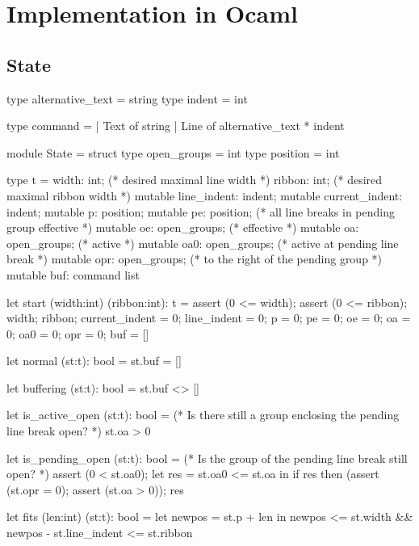 \documentclass[12pt]{article}
\begin{document}
\section{Implementation in Ocaml}


\subsection{State}

\begin{ocaml}
type alternative_text = string
type indent = int

type command =
  | Text of string
  | Line of alternative_text * indent

module State =
  struct
    type open_groups = int
    type position = int

    type t = {width: int;          (* desired maximal line width *)
              ribbon: int;         (* desired maximal ribbon width *)
              mutable line_indent: indent;
              mutable current_indent: indent;
              mutable p: position;
              mutable pe: position; (* all line breaks in pending group
                                       effective *)
              mutable oe: open_groups;  (* effective *)
              mutable oa: open_groups;  (* active *)
              mutable oa0: open_groups; (* active at pending line break *)
              mutable opr: open_groups; (* to the right of the pending group *)
              mutable buf: command list
             }


    let start  (width:int) (ribbon:int): t =
      assert (0 <= width);
      assert (0 <= ribbon);
      {width; ribbon;
       current_indent = 0;   line_indent = 0;
       p = 0;  pe = 0;
       oe = 0; oa = 0; oa0 = 0; opr = 0;
       buf = []
      }

    let normal (st:t): bool    = st.buf = []

    let buffering (st:t): bool = st.buf <> []

    let is_active_open (st:t): bool =
      (* Is there still a group enclosing the pending line break open? *)
      st.oa > 0

    let is_pending_open (st:t): bool =
      (* Is the group of the pending line break still open? *)
      assert (0 < st.oa0);
      let res = st.oa0 <= st.oa in
      if res then
        (assert (st.opr = 0); assert (st.oa > 0));
      res

    let fits (len:int) (st:t): bool =
      let newpos = st.p + len
      in
      newpos <= st.width && newpos - st.line_indent <= st.ribbon


\end{ocaml}
\end{document}
